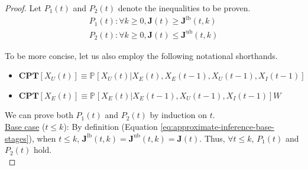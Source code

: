 \documentclass[10pt]{article}
\newcommand{\PP}[2][]{\mathbb{P\!}_{#1}\left[#2\right]}
\newcommand{\PPlb}[2][]{\mathbb{P}^\text{lb}_{#1}\left[#2\right]}
\newcommand{\PPub}[2][]{\mathbb{P}^\text{ub}_{#1}\left[#2\right]}
\begin{document}
\begin{proof}
Let $P_1(t)$ and $P_2(t)$ denote the inequalities to be proven.
\begin{eqnarray*}
P_1(t): \forall k\geq 0, \boldsymbol{J}(t) \geq \boldsymbol{J}^\text{lb}(t,k) \\
P_2(t): \forall k\geq 0, \boldsymbol{J}(t) \leq \boldsymbol{J}^\text{ub}(t,k)
\end{eqnarray*}

\noindent To be more concise, let us also employ the following notational shorthands.
\begin{itemize}
 \item $\textbf{CPT}\!\left[X_{U}(t)\right] \equiv \PP{X_{U}(t)|X_{E}(t),X_{E}(t\!-\!1),X_{U}(t\!-\!1),X_{I}(t\!-\!1)}$
 \item $\textbf{CPT}\!\left[X_{E}(t)\right] \equiv \PP{X_{E}(t)|X_{E}(t\!-\!1),X_{U}(t\!-\!1),X_{I}(t\!-\!1)}W$
\end{itemize}


\noindent We can prove both $P_1(t)$ and $P_2(t)$ by induction on $t$.\\

\noindent \underline{Base case} ($t\leq k$): By definition (Equation \ref{eq:approximate-inference-base-stages}), when $t\leq k$, 
$\boldsymbol{J}^\text{lb}(t,k)=\boldsymbol{J}^\text{ub}(t,k)=\boldsymbol{J}(t)$.
Thus, $\forall t \leq k$, $P_1(t)$ and $P_2(t)$ hold.\\


\end{proof}
\end{document}
